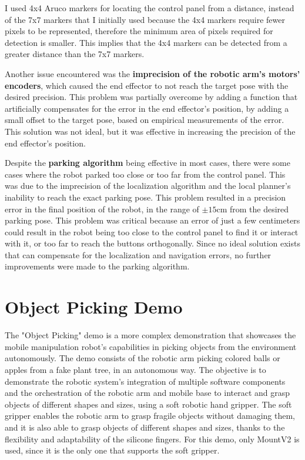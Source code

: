 I used 4x4 Aruco markers for locating the control panel from a distance, instead of the 7x7 markers that I initially 
used because the 4x4 markers require fewer pixels to be represented, therefore the minimum area of pixels required
for detection is smaller. This implies that the 4x4 markers can be detected from a greater distance than the 7x7 markers.

Another issue encountered was the \textbf{imprecision of the robotic arm's motors' encoders}, which caused the end effector
to not reach the target pose with the desired precision. This problem was partially overcome by adding a function
that artificially compensates for the error in the end effector's position, by adding a small offset 
to the target pose, based on empirical measurements of the error. This solution was not ideal, but it was effective
in increasing the precision of the end effector's position.

Despite the \textbf{parking algorithm} being effective in most cases, there were some cases where the robot parked too close
or too far from the control panel. This was due to the imprecision of the localization algorithm and the
local planner's inability to reach the exact parking pose. This problem resulted in a precision error 
in the final position of the robot, in the range of $\pm 15$cm from the desired parking pose. This problem was
critical because an error of just a few centimeters could result in the robot being too close to the control panel
to find it or interact with it, or too far to reach the buttons orthogonally. Since no ideal solution exists that
can compensate for the localization and navigation errors, no further improvements were made to the parking algorithm.

\section{Object Picking Demo}

The "Object Picking" demo is a more complex demonstration that showcases the mobile manipulation robot's capabilities
in picking objects from the environment autonomously. The demo consists of the robotic arm picking colored balls
or apples from a fake plant tree, in an autonomous way. The objective is to demonstrate the robotic system's integration of
multiple software components and the orchestration of the robotic arm and mobile base to interact and grasp objects of
different shapes and sizes, using a soft robotic hand gripper.
The soft gripper enables the robotic arm to grasp fragile objects without damaging them, and it is also able to
grasp objects of different shapes and sizes, thanks to the flexibility and adaptability of the silicone fingers.
For this demo, only MountV2 is used, since it is the only one that supports the soft gripper.

